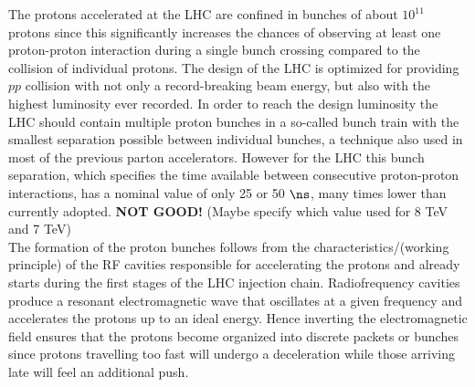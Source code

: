 The protons accelerated at the LHC are confined in bunches of about $10^{11}$ protons since this significantly increases the chances of observing at least one proton-proton interaction during a single bunch crossing compared to the collision of individual protons. 
The design of the LHC is optimized for providing $pp$ collision with not only a record-breaking beam energy, but also with the highest luminosity ever recorded. In order to reach the design luminosity the LHC should contain multiple proton bunches in a so-called bunch train with the smallest separation possible between individual bunches, a technique also used in most of the previous parton accelerators. 
However for the LHC this bunch separation, which specifies the time available between consecutive proton-proton interactions, has a nominal value of only 25 or 50 $\ns$, many times lower than currently adopted. \textbf{NOT GOOD!} (Maybe specify which value used for 8 TeV and 7 TeV)
\\
The formation of the proton bunches follows from the characteristics/(working principle) of the RF cavities responsible for accelerating the protons and already starts during the first stages of the LHC injection chain. 
Radiofrequency cavities produce a resonant electromagnetic wave that oscillates at a given frequency and accelerates the protons up to an ideal energy.
Hence inverting the electromagnetic field ensures that the protons become organized into discrete packets or bunches since protons travelling too fast will undergo a deceleration while those arriving late will feel an additional push.
